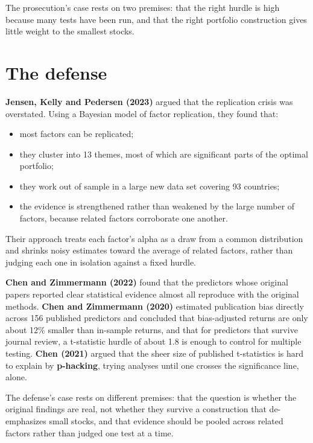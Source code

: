 The prosecution's case rests on two premises: that the right hurdle is high because many tests have been run, and that the right portfolio construction gives little weight to the smallest stocks.

\section{The defense}
\label{sec:07-defense}

\textbf{Jensen, Kelly and Pedersen (2023)} argued that the replication crisis was overstated. Using a Bayesian model of factor replication, they found that:

\begin{itemize}
  \item most factors can be replicated;
  \item they cluster into 13 themes, most of which are significant parts of the optimal portfolio;
  \item they work out of sample in a large new data set covering 93 countries;
  \item the evidence is strengthened rather than weakened by the large number of factors, because related factors corroborate one another.
\end{itemize}

Their approach treats each factor's alpha as a draw from a common distribution and shrinks noisy estimates toward the average of related factors, rather than judging each one in isolation against a fixed hurdle.

\textbf{Chen and Zimmermann (2022)} found that the predictors whose original papers reported clear statistical evidence almost all reproduce with the original methods. \textbf{Chen and Zimmermann (2020)} estimated publication bias directly across 156 published predictors and concluded that bias-adjusted returns are only about 12\% smaller than in-sample returns, and that for predictors that survive journal review, a t-statistic hurdle of about 1.8 is enough to control for multiple testing. \textbf{Chen (2021)} argued that the sheer size of published t-statistics is hard to explain by \textbf{p-hacking}, trying analyses until one crosses the significance line, alone.

The defense's case rests on different premises: that the question is whether the original findings are real, not whether they survive a construction that de-emphasizes small stocks, and that evidence should be pooled across related factors rather than judged one test at a time.

